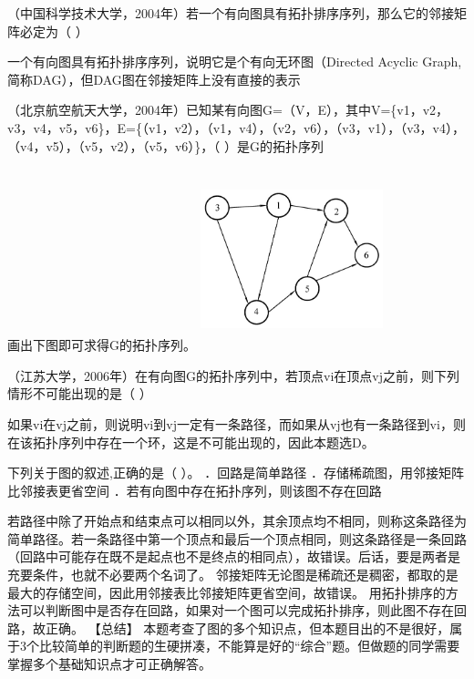 \question （中国科学技术大学，2004年）若一个有向图具有拓扑排序序列，那么它的邻接矩阵必定为（
）
\par{}
\begin{solution}一个有向图具有拓扑排序序列，说明它是个有向无环图（Directed Acyclic
Graph,简称DAG），但DAG图在邻接矩阵上没有直接的表示
\end{solution}
\question （北京航空航天大学，2004年）已知某有向图G=（V，E），其中V=\{v1，v2，v3，v4，v5，v6\}，E=\{（v1，v2），（v1，v4），（v2，v6），（v3，v1），（v3，v4），（v4，v5），（v5，v2），（v5，v6）\}，（
）是G的拓扑序列
\par{}
\begin{solution}画出下图即可求得G的拓扑序列。
\includegraphics[width=2.08333in,height=2.08333in]{computerassets/81eae3ad3bd2585a68b0b81f131f8a7e.jpeg}
\end{solution}
\question （江苏大学，2006年）在有向图G的拓扑序列中，若顶点vi在顶点vj之前，则下列情形不可能出现的是（
）
\par{}
\begin{solution}如果vi在vj之前，则说明vi到vj一定有一条路径，而如果从vj也有一条路径到vi，则在该拓扑序列中存在一个环，这是不可能出现的，因此本题选D。
\end{solution}
\question 下列关于图的叙述,正确的是（ ）。 ．回路是简单路径
．存储稀疏图，用邻接矩阵比邻接表更省空间
．若有向图中存在拓扑序列，则该图不存在回路
\par{}
\begin{solution}若路径中除了开始点和结束点可以相同以外，其余顶点均不相同，则称这条路径为简单路径。若一条路径中第一个顶点和最后一个顶点相同，则这条路径是一条回路（回路中可能存在既不是起点也不是终点的相同点），故错误。后话，要是两者是充要条件，也就不必要两个名词了。
邻接矩阵无论图是稀疏还是稠密，都取的是最大的存储空间，因此用邻接表比邻接矩阵更省空间，故错误。
用拓扑排序的方法可以判断图中是否存在回路，如果对一个图可以完成拓扑排序，则此图不存在回路，故正确。
【总结】
本题考查了图的多个知识点，但本题目出的不是很好，属于3个比较简单的判断题的生硬拼凑，不能算是好的``综合''题。但做题的同学需要掌握多个基础知识点才可正确解答。
\end{solution}
